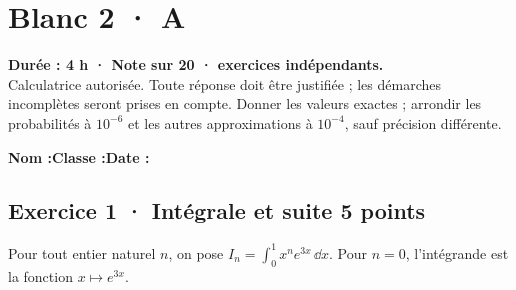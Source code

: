 \fi

\ifmxteacher

\mxnewpage{}\label{sujet:8-3}

\section*{Blanc 2 · A}


\textbf{Durée : 4 h · Note sur 20 ·  exercices indépendants.}\\Calculatrice autorisée. Toute réponse doit être justifiée ; les démarches incomplètes seront prises en compte. Donner les valeurs exactes ; arrondir les probabilités à $10^{-6}$ et les autres approximations à $10^{-4}$, sauf précision différente.

\smallskip\textbf{Nom :}\enspace\dotfill\quad\textbf{Classe :}\enspace\dotfill\quad\textbf{Date :}\enspace\dotfill

\subsection*{Exercice 1 · Intégrale et suite \hfill 5 points}Pour tout entier naturel $n$, on pose $I_n=\displaystyle\int_0^1x^ne^{3x}\,\dd x$. Pour $n=0$, l'intégrande est la fonction $x\mapsto e^{3x}$.

